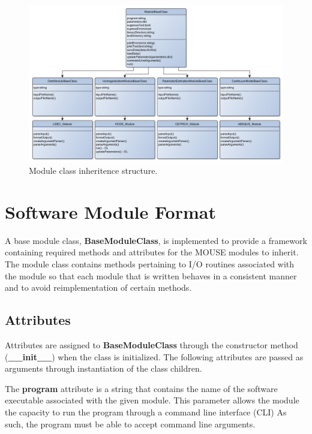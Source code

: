 \begin{figure}
\begin{center}
\includegraphics[width=\textwidth]{figures/Chapter4/ModuleClassUML}
\caption{{\label{fig:moduleClass} Module class inheritence structure.%
}}
\end{center}
\end{figure}

\section{Software Module Format}

A base module class, \textbf{BaseModuleClass}, is implemented to provide a framework containing required methods and attributes for the MOUSE modules to inherit. The module class contains methods pertaining to I/O routines associated with the module so that each module that is written behaves in a consistent manner and to avoid reimplementation of certain methods. 

\subsection{Attributes}

Attributes are assigned to \textbf{BaseModuleClass} through the constructor method (\textbf{\_\_init\_\_}) when the class is initialized. The following attributes are passed as arguments through instantiation of the class children. 

The \textbf{program} attribute is a string that contains the name of the software executable associated with the given module. This parameter allows the module the capacity to run the program through a command line interface (CLI) As such, the program must be able to accept command line arguments.

